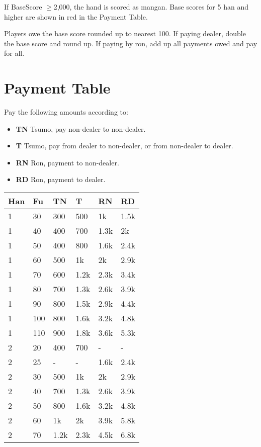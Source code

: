 \documentclass[8pt,a4paper]{extarticle}
\begin{document}
\begin{multicols*}{5}
If BaseScore $\geq$2,000, the hand is scored as mangan. Base scores for 5 han and higher are shown in \color{Red}red \color{Black}in the Payment Table.

\smallskip 

Players owe the base score rounded up to nearest 100. If paying dealer, double the base score and round up. If paying by ron, add up all payments owed and pay for all.

\section*{Payment Table}
Pay the following amounts according to:
\begin{itemize}[nolistsep,leftmargin=1em]
    \item \textbf{TN} Tsumo, pay non-dealer to non-dealer.
    \item \textbf{T} Tsumo, pay from dealer to non-dealer, or from non-dealer to dealer.
    \item \textbf{RN} Ron, payment to non-dealer.
    \item \textbf{RD} Ron, payment to dealer.
\end{itemize}
\smallskip
\small
\begin{tabularx}{\columnwidth}{llXXXX}
\toprule
Han & Fu & TN & T & RN & RD \\ \midrule
1 & 30 & 300 & 500 & 1k & 1.5k \\
1 & 40 & 400 & 700 & 1.3k & 2k \\
1 & 50 & 400 & 800 & 1.6k & 2.4k \\
1 & 60 & 500 & 1k & 2k & 2.9k \\
1 & 70 & 600 & 1.2k & 2.3k & 3.4k \\
1 & 80 & 700 & 1.3k & 2.6k & 3.9k \\
1 & 90 & 800 & 1.5k & 2.9k & 4.4k \\
1 & 100 & 800 & 1.6k & 3.2k & 4.8k \\
1 & 110 & 900 & 1.8k & 3.6k & 5.3k \\
2 & 20 & 400 & 700 & - & - \\
2 & 25 & - & - & 1.6k & 2.4k \\
2 & 30 & 500 & 1k & 2k & 2.9k \\
2 & 40 & 700 & 1.3k & 2.6k & 3.9k \\
2 & 50 & 800 & 1.6k & 3.2k & 4.8k \\
2 & 60 & 1k & 2k & 3.9k & 5.8k \\
2 & 70 & 1.2k & 2.3k & 4.5k & 6.8k \\

\end{tabularx}
\end{multicols*}
\end{document}
